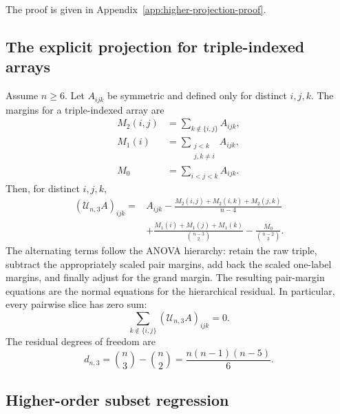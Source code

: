 \documentclass[11pt]{article}
\theoremstyle{plain}
\theoremstyle{definition}
\theoremstyle{remark}
\newcommand{\cU}{\mathcal U}
\begin{document}
\noindent The proof is given in
Appendix~\ref{app:higher-projection-proof}.

\subsection{\texorpdfstring{{The explicit projection for triple-indexed arrays}}{The explicit projection for triple-indexed arrays}}

Assume $n\ge6$.  Let $A_{ijk}$ be symmetric and defined only for distinct
$i,j,k$.  The margins for a triple-indexed array are
\begin{align*}
 M_2(i,j)&=\sum_{k\notin\{i,j\}}A_{ijk},\\
 M_1(i)&=\sum_{\substack{j<k\\j,k\ne i}}A_{ijk},\\
 M_0&=\sum_{i<j<k}A_{ijk}.
\end{align*}
Then, for distinct $i,j,k$,
\begin{equation}\label{eq:r3-formula}
\begin{split}
 (\cU_{n,3}A)_{ijk}
 ={}&A_{ijk}
 -\frac{M_2(i,j)+M_2(i,k)+M_2(j,k)}{n-4}\\
 &+\frac{M_1(i)+M_1(j)+M_1(k)}{\binom{n-3}{2}}
 -\frac{M_0}{\binom{n-2}{3}}.
\end{split}
\end{equation}
The alternating terms follow the ANOVA hierarchy: retain the raw triple,
subtract the appropriately scaled pair margins, add back the scaled one-label
margins, and finally adjust for the grand margin.
The resulting pair-margin equations are the normal equations for the
hierarchical residual.  In particular, every pairwise slice has zero sum:
  \begin{equation*}
 \sum_{k\notin\{i,j\}}(\cU_{n,3}A)_{ijk}=0.
\end{equation*}
The residual degrees of freedom are
  \begin{equation*}
 d_{n,3}=\binom n3-\binom n2
 =\frac{n(n-1)(n-5)}{6}.
\end{equation*}

\subsection{Higher-order subset regression}
\label{sec:higher-order-subset-regression}
\end{document}
